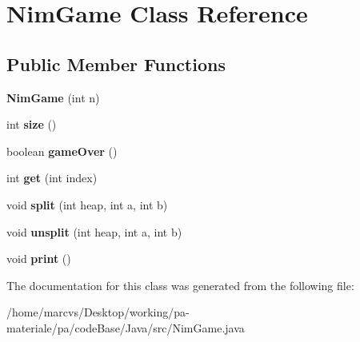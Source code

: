 \hypertarget{classNimGame}{
\section{NimGame Class Reference}
\label{classNimGame}
}
\subsection*{Public Member Functions}
\begin{DoxyCompactItemize}
\item 
\hypertarget{classNimGame_a8543bfe2b34632f4c94977cb62637e33}{
{\bfseries NimGame} (int n)}
\label{classNimGame_a8543bfe2b34632f4c94977cb62637e33}

\item 
\hypertarget{classNimGame_af1c40e64cf13a03ef237ccb04a9e14df}{
int {\bfseries size} ()}
\label{classNimGame_af1c40e64cf13a03ef237ccb04a9e14df}

\item 
\hypertarget{classNimGame_ab53242c239178356333cd8621ef17e3e}{
boolean {\bfseries gameOver} ()}
\label{classNimGame_ab53242c239178356333cd8621ef17e3e}

\item 
\hypertarget{classNimGame_a77f7701745e5b67a695dfbdc8ea32e9e}{
int {\bfseries get} (int index)}
\label{classNimGame_a77f7701745e5b67a695dfbdc8ea32e9e}

\item 
\hypertarget{classNimGame_a63b153aa9874dfe8e2d8bd486143a015}{
void {\bfseries split} (int heap, int a, int b)}
\label{classNimGame_a63b153aa9874dfe8e2d8bd486143a015}

\item 
\hypertarget{classNimGame_a7e8904a911442a899d1420b1ea913f01}{
void {\bfseries unsplit} (int heap, int a, int b)}
\label{classNimGame_a7e8904a911442a899d1420b1ea913f01}

\item 
\hypertarget{classNimGame_a1ab91c05860dd790a8fc2e0f35fbb00a}{
void {\bfseries print} ()}
\label{classNimGame_a1ab91c05860dd790a8fc2e0f35fbb00a}

\end{DoxyCompactItemize}


The documentation for this class was generated from the following file:\begin{DoxyCompactItemize}
\item 
/home/marcvs/Desktop/working/pa-\/materiale/pa/codeBase/Java/src/NimGame.java\end{DoxyCompactItemize}
